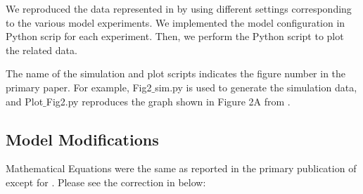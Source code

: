 \documentclass[fleqn,10pt]{physiome}
\begin{document}
We reproduced the data represented in \citet[Figures 2A, 3A, 4A, 6(A and B) \& 8A ]{imtiaz2002theoretical} by using different settings corresponding to the various model experiments. We implemented the model configuration in Python scrip for each experiment. Then, we perform the Python script to plot the related data.

The name of the simulation and plot scripts indicates the figure number in the primary paper. For example,
Fig2$\_$sim.py is used to generate the simulation data, and Plot$\_$Fig2.py reproduces the graph shown in Figure 2A from \citep{imtiaz2002theoretical}.

\subsection{Model Modifications }

Mathematical Equations were the same as reported in the primary publication of \citet{imtiaz2002theoretical} except for \cite[Equations 3, 7, and 9]{imtiaz2002theoretical}. Please see the correction in below:




\label{Parameter_Values}
\end{document}
